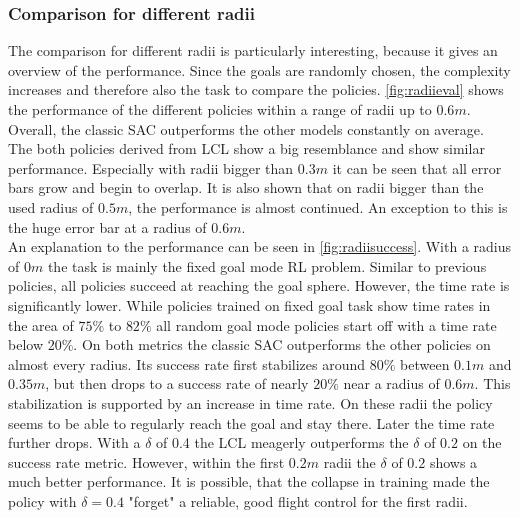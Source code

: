 \subsubsection{Comparison for different radii}
The comparison for different radii is particularly interesting, because it gives an 
overview of the performance.
Since the goals are randomly chosen, the complexity increases and therefore
also the task to compare the policies.
\cref{fig:radiieval} shows the performance of the different policies within 
a range of radii up to $0.6m$.
Overall, the classic SAC outperforms the other models constantly on average.
The both policies derived from LCL show a big resemblance and show similar performance.
Especially with radii bigger than $0.3m$ it can be seen that all error bars grow and 
begin to overlap. It is also shown that on radii bigger than the used radius of $0.5m$,
the performance is almost continued. An exception to this is the huge error 
bar at a radius of $0.6m$.\\
An explanation to the performance can be seen in \cref{fig:radiisuccess}.
With a radius of $0m$ the task is mainly the fixed goal mode RL problem.
Similar to previous policies, all policies succeed at reaching the goal sphere.
However, the time rate is significantly lower.
While policies trained on fixed goal task show time rates in the area of $75\%$ to $82 \%$
all random goal mode policies start off with a time rate below $20 \%$.
On both metrics the classic SAC outperforms the other policies on almost 
every radius.
Its success rate first stabilizes around $80\%$ between $0.1m$ and $0.35m$, but then 
drops to a success rate of nearly $20 \%$ near a radius of $0.6m$.
This stabilization is supported by an increase in time rate. 
On these radii the policy seems to be able to regularly reach the goal and 
stay there. Later the time rate further drops.
With a $\delta$ of 0.4 the LCL meagerly outperforms the $\delta$ of $0.2$ on 
the success rate metric.
However, within the first $0.2m$ radii the $\delta$ of $0.2$ shows a much better 
performance. It is possible, that the collapse in training 
made the policy with $\delta = 0.4$ "forget" a reliable, good flight control for 
the first radii.


